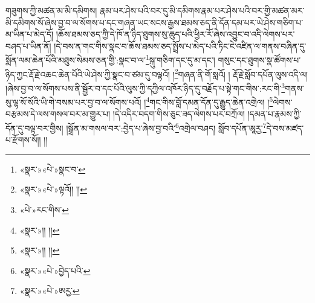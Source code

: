 གཟུགས་ཀྱི་མཚན་མ་མི་དམིགས། རྣམ་པར་ཤེས་པའི་བར་དུ་མི་དམིགས་རྣམ་པར་ཤེས་པའི་བར་གྱི་མཚན་མར་མི་དམིགས་སོ་ཞེས་བྱ་བ་ལ་སོགས་པ་དང་གཞན་ཡང་སངས་རྒྱས་ཐམས་ཅད་ནི་དོན་དམ་པར་ཡེ་ཤེས་གཅིག་པ་མ་ཡིན་པ་མེད་དོ། །ཆོས་ཐམས་ཅད་ཀྱི་དེ་ཁོ་ན་ཉིད་ཐུགས་སུ་ཆུད་པའི་ཕྱིར་རོ་ཞེས་འབྱུང་བ་འདི་ལེགས་པར་བཤད་པ་ཡིན་ནོ། །དེ་བས་ན་གང་གིས་སྣང་བ་ཆོས་ཐམས་ཅད་སྤྲོས་པ་མེད་པའི་ཏིང་ངེ་འཛིན་ལ་གནས་བཞིན་དུ་སྨོན་ལམ་ཆེན་པོའི་མཐུས་སེམས་ཅན་གྱི་:སྣང་བ་ལ་\footnote{«སྣར་»«པེ་»སྣང་བ་}སྐུ་གཅིག་དང་དུ་མ་དང་། གསུང་དང་ཐུགས་སྣ་ཚོགས་པ་ཉིད་ཀྱང་རྡོ་རྗེ་འཆང་ཆེན་པོའི་ཡེ་ཤེས་ཀྱི་སྣང་བ་ཙམ་དུ་བལྟའོ། །\footnote{«སྣར་»«པེ་»ལྟའོ།། །།}གཞན་ནི་གོ་སླའོ། །
རྡོ་རྗེ་སློབ་དཔོན་ལུས་འདི་ལ། །ཞེས་བྱ་བ་ལ་སོགས་པས་ནི་སྦྱོར་བ་དང་པོའི་ལུས་ཀྱི་དཀྱིལ་འཁོར་ཉིད་དུ་བརྗོད་པ་སྟེ་གང་གིས་:རང་གི་\footnote{«པེ་»རང་གིས་}གནས་སུ་ལྷ་སོ་སོའི་ཡི་གེ་བསམ་པར་བྱ་བ་ལ་སོགས་པའོ། །\footnote{«སྣར་»།། །།}གང་གིས་བློ་དམན་དོན་དུ་རྒྱུད་ཆེན་འགྲེལ། །\footnote{«སྣར་»།། །།}ལེགས་བརྩམས་དེ་ལས་གསལ་བར་མ་གྱུར་པ། །དེ་འདིར་བདག་གིས་ཅུང་ཟད་ལེགས་པར་བཀྲོལ། །དམན་པ་རྣམས་ཀྱི་དོན་དུ་བལྟ་བར་གྱིས། །སྒྲོན་མ་གསལ་བར་:བྱེད་པ་ཞེས་བྱ་བའི་\footnote{«སྣར་»«པེ་»བྱེད་པའི་}འགྲེལ་བཤད། སློབ་དཔོན་ཨཱརྱ་\footnote{«སྣར་»«པེ་»ཨརྱ་}དེ་བས་མཛད་པ་རྫོགས་སོ།། །།